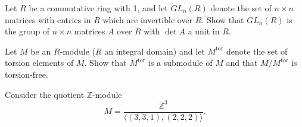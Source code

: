 \documentclass[answers]{exam}
\begin{document}
\begin{questions}
\question%
Let $R$ be a commutative ring with 1, and let $GL_{n}(R)$ denote the set of $n \times n$ matrices with entries in $R$ which are invertible over $R$. Show that $GL_{n}(R)$ is the group of $n \times n$ matrices $A$ over $R$ with $\det A$ a unit in $R$.



\question%



\question%
Let $M$ be an $R$-module ($R$ an integral domain) and let $M^{\mathrm{tor}}$ denote the set of torsion elements of $M$. Show that $M^{\mathrm{tor}}$ is a submodule of $M$ and that $M / M^{\mathrm{tor}}$ is torsion-free.



\question%
Consider the quotient $\mathbb{Z}$-module \[
	M=\frac{\mathbb{Z}^{3}}{\langle(3,3,1),(2,2,2)\rangle}.
\]
\end{questions}
\end{document}
